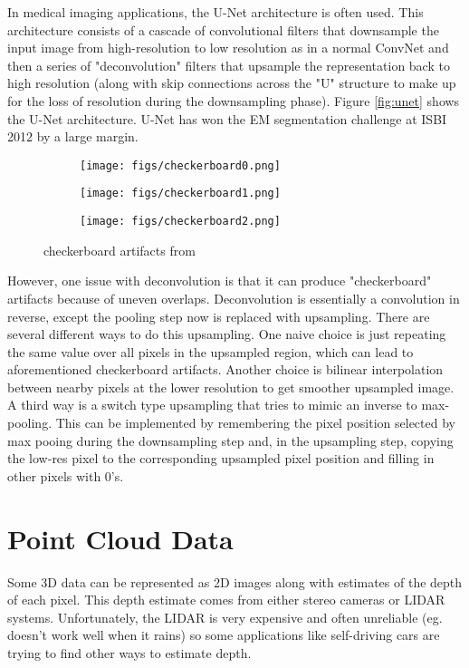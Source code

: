 In medical imaging applications, the U-Net architecture is often used. This architecture consists of a cascade of convolutional filters that downsample the input image from high-resolution to low resolution as in a normal ConvNet and then a series of "deconvolution" filters that upsample the representation back to high resolution (along with skip connections across the "U" structure to make up for the loss of resolution during the downsampling phase). Figure \ref{fig:unet} shows the U-Net architecture. U-Net has won the EM segmentation challenge at ISBI 2012 by a large margin.

\begin{figure}[ht]
    \centering
    \begin{subfigure}{0.25\textwidth}
    \texttt{[image: figs/checkerboard0.png]} 
    \end{subfigure}
    \begin{subfigure}{0.25\textwidth}
    \texttt{[image: figs/checkerboard1.png]}
    \end{subfigure}
    \begin{subfigure}{0.25\textwidth}
    \texttt{[image: figs/checkerboard2.png]}
    \end{subfigure}
    \caption{checkerboard artifacts from \citep{odena2016deconvolution}}
    \label{fig:checkerboard}
\end{figure}

However, one issue with deconvolution is that it can produce "checkerboard" artifacts because of uneven overlaps. Deconvolution is essentially a convolution in reverse, except the pooling step now is replaced with upsampling. There are several different ways to do this upsampling. One naive choice is just repeating the same value over all pixels in the upsampled region, which can lead to aforementioned checkerboard artifacts. Another choice is bilinear interpolation between nearby pixels at the lower resolution to get smoother upsampled image. A third way is a switch type upsampling that tries to mimic an inverse to max-pooling. This can be implemented by remembering the pixel position selected by max pooing during the downsampling step and, in the upsampling step, copying the low-res pixel to the corresponding upsampled pixel position and filling in other pixels with 0's.
\section{Point Cloud Data}
Some 3D data can be represented as 2D images along with estimates of the depth of each pixel. This depth estimate comes from either stereo cameras or LIDAR systems. Unfortunately, the LIDAR is very expensive and often unreliable (eg. doesn't work well when it rains) so some applications like self-driving cars are trying to find other ways to estimate depth.


